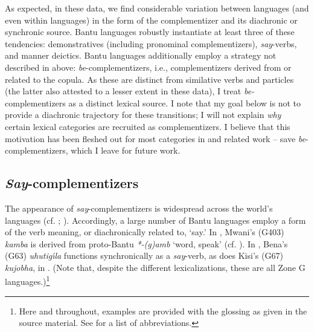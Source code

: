 \documentclass[output=paper,colorlinks,citecolor=brown,
]{langscibook}
\begin{document}
As expected, in these data, we find considerable variation between languages (and even within languages) in the form of the complementizer and its diachronic or synchronic source. Bantu languages robustly instantiate at least three of these tendencies: demonstratives (including pronominal complementizers), \textit{say}-verbs, and manner deictics. Bantu languages additionally employ a strategy not described in  above: \textit{be}-complementizers, i.e., complementizers derived from or related to the copula. As these are distinct from similative verbs and particles (the latter also attested to a lesser extent in these data), I treat \textit{be-}complementizers as a distinct lexical source. I note that my goal below is not to provide a diachronic trajectory for these transitions; I will not explain \textit{why} certain lexical categories are recruited as complementizers. I believe that this motivation has been fleshed out for most categories in \citet{Kutevaetal:2019} and related work -- save \textit{be}-complementizers, which I leave for future work.


\subsection{\textit{Say}-complementizers}\label{sec:gluckman:saycomplementizers}

The appearance of \textit{say}-complementizers is widespread across the world's languages (cf. \citealt[14]{HopperTraugott:1993}; \citealt[375]{Kutevaetal:2019}). Accordingly, a large number of Bantu languages employ a form of the verb meaning, or diachronically related to,  `say.' In , Mwani's (G403) \textit{kamba} is derived from proto-Bantu \textit{*-(g)amb} `word, speak' (cf. \citealt[94]{Meeussen:1967}). In , Bena's (G63) \textit{uhutig{\'\i}la} functions synchronically as a \textit{say}-verb, as does Kisi's (G67) \textit{kujobha}, in . (Note that, despite the different lexicalizations, these are all Zone G languages.)\footnote{Here and throughout, examples are provided with the glossing as given in the source material. See  for a list of abbreviations.}
\end{document}
